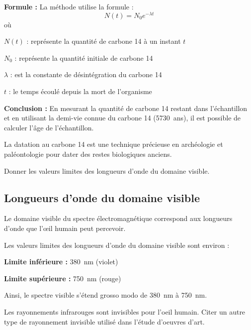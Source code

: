 \documentclass[answers]{exam}
\begin{document}
\begin{questions}
\begin{solution}
\begin{compactitem}
    \item \textbf{Formule :} La méthode utilise la formule :
    \[
    N(t) = N_0e^{-\lambda t}
    \]
    où 
    \begin{addmargin}[4em]{1em}
    \begin{compactitem}
        \item [$N(t)$]: représente la quantité de carbone 14 à un instant $t$
        \item [$N_0$]: représente la quantité initiale de carbone 14
        \item [$\lambda$]: est la constante de désintégration du carbone 14
        \item [$t$]: le temps écoulé depuis la mort de l'organisme
    \end{compactitem}
    \end{addmargin}
    
    \item \textbf{Conclusion :} En mesurant la quantité de carbone 14 restant dans l'échantillon et en utilisant la demi-vie connue du carbone 14 (\SI{5730}{ans}), il est possible de calculer l'âge de l'échantillon.
\end{compactitem}

La datation au carbone 14 est une technique précieuse en archéologie et paléontologie pour dater des restes biologiques anciens.

\end{solution}

\question[1] Donner les valeurs limites des longueurs d'onde du domaine visible.


\begin{solution}

\subsection*{Longueurs d'onde du domaine visible}

Le domaine visible du spectre électromagnétique correspond aux longueurs d'onde que l'œil humain peut percevoir. 

Les valeurs limites des longueurs d'onde du domaine visible sont environ :

\begin{compactitem}
    \item \textbf{Limite inférieure :} \SI{380}{\nano\meter} (violet)
    \item \textbf{Limite supérieure :} \SI{750}{\nano\meter} (rouge)
\end{compactitem}

Ainsi, le spectre visible s'étend grosso modo de \SI{380}{\nano\meter} à \SI{750}{\nano\meter}.

\end{solution}

\question[1] Les rayonnements infrarouges sont invisibles pour l'oeil humain. Citer un autre type de rayonnement invisible utilisé dans l'étude d'oeuvres d'art.

\end{questions}
\end{document}
